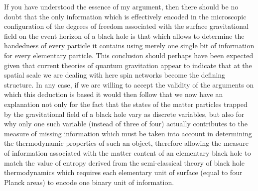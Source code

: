 \documentclass[notitlepage,12pt]{report}
\begin{document}
\noindent If you have understood the essence of my argument, then there should be no doubt that the only information which is effectively encoded in the microscopic configuration of the degrees of freedom associated with the surface gravitational field on the event horizon of a black hole is that which allows to determine the handedness of every particle it contains using merely one single bit of information for every elementary particle. This conclusion should perhaps have been expected given that current theories of quantum gravitation appear to indicate that at the spatial scale we are dealing with here spin networks become the defining structure. In any case, if we are willing to accept the validity of the arguments on which this deduction is based it would then follow that we now have an explanation not only for the fact that the states of the matter particles trapped by the gravitational field of a black hole vary as discrete variables, but also for why only one such variable (instead of three of four) actually contributes to the measure of missing information which must be taken into account in determining the thermodynamic properties of such an object, therefore allowing the measure of information associated with the matter content of an elementary black hole to match the value of entropy derived from the semi-classical theory of black hole thermodynamics which requires each elementary unit of surface (equal to four Planck areas) to encode one binary unit of information.
\end{document}
